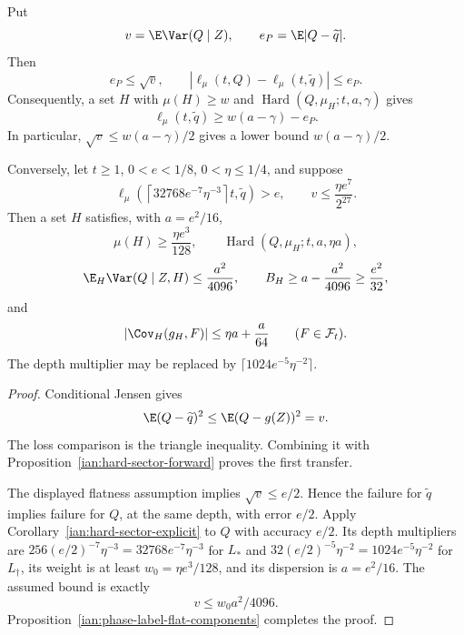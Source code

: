 \begin{proposition}
\label{ian:phase-label-posterior-flat-transfer}
Put
\[
 v=\E\Var(Q\mid Z),\qquad
 e_P=\E|Q-\widetilde q|.
\]
Then
\[
 e_P\le\sqrt v,\qquad
 |\ell_\mu(t,Q)-\ell_\mu(t,\widetilde q)|\le e_P.
\]
Consequently, a set \(H\) with \(\mu(H)\ge w\) and \(\operatorname{Hard}(Q,\mu_H;t,a,\gamma)\) gives
\[
 \ell_\mu(t,\widetilde q)\ge w(a-\gamma)-e_P.
\]
In particular, \(\sqrt v\le w(a-\gamma)/2\) gives a lower bound
\(w(a-\gamma)/2\).

Conversely, let \(t\ge1\), \(0<e<1/8\), \(0<\eta\le1/4\), and suppose
\[
 \ell_\mu\left(
 \left\lceil32768e^{-7}\eta^{-3}\right\rceil t,
 \widetilde q\right)>e,\qquad
 v\le\frac{\eta e^7}{2^{27}}.
\]
Then a set \(H\) satisfies, with \(a=e^2/16\),
\[
 \mu(H)\ge\frac{\eta e^3}{128},\qquad
 \operatorname{Hard}(Q,\mu_H;t,a,\eta a),
\]
\[
 \E_H\Var(Q\mid Z,H)\le\frac{a^2}{4096},\qquad
 B_H\ge a-\frac{a^2}{4096}\ge\frac{e^2}{32},
\]
and
\[
 |\Cov_H(g_H,F)|\le\eta a+\frac a{64}
 \qquad(F\in\mathcal F_t).
\]
The depth multiplier may be replaced by \(\lceil1024e^{-5}\eta^{-2}\rceil\).
\end{proposition}

\begin{proof}
Conditional Jensen gives
\[
 \E(Q-\widetilde q)^2
 \le\E(Q-g(Z))^2=v.
\]
The loss comparison is the triangle inequality. Combining it with
Proposition~\ref{ian:hard-sector-forward} proves the first transfer.

The displayed flatness assumption implies \(\sqrt v\le e/2\). Hence the failure for \(\widetilde q\) implies failure for \(Q\), at the same depth, with error \(e/2\). Apply
Corollary~\ref{ian:hard-sector-explicit} to \(Q\) with accuracy \(e/2\). Its depth multipliers are
\(256(e/2)^{-7}\eta^{-3}=32768e^{-7}\eta^{-3}\) for \(L_*\) and \(32(e/2)^{-5}\eta^{-2}=1024e^{-5}\eta^{-2}\) for \(L_\dagger\), its weight is at least
\(w_0=\eta e^3/128\), and its dispersion is \(a=e^2/16\). The assumed bound is exactly
\[
 v\le w_0a^2/4096.
\]
Proposition~\ref{ian:phase-label-flat-components} completes the proof.
\end{proof}

